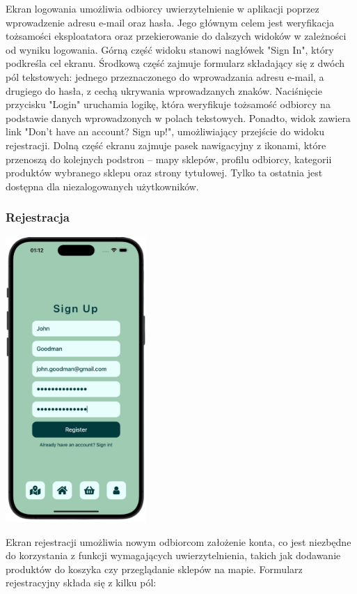 Ekran logowania umożliwia odbiorcy uwierzytelnienie w aplikacji poprzez wprowadzenie adresu e-mail oraz hasła. Jego głównym celem jest weryfikacja tożsamości eksploatatora oraz przekierowanie do dalszych widoków w zależności od wyniku logowania. Górną część widoku stanowi nagłówek "Sign In", który podkreśla cel ekranu. Środkową część zajmuje formularz składający się z dwóch pól tekstowych: jednego przeznaczonego do wprowadzania adresu e-mail, a drugiego do hasła, z cechą ukrywania wprowadzanych znaków. Naciśnięcie przycisku "Login" uruchamia logikę, która weryfikuje tożsamość odbiorcy na podstawie danych wprowadzonych w polach tekstowych. Ponadto, widok zawiera link "Don't have an account? Sign up!", umożliwiający przejście do widoku rejestracji. Dolną część ekranu zajmuje pasek nawigacyjny z ikonami, które przenoszą do kolejnych podstron – mapy sklepów, profilu odbiorcy, kategorii produktów wybranego sklepu oraz strony tytułowej. Tylko ta ostatnia jest dostępna dla niezalogowanych użytkowników.

\subsubsection{Rejestracja}

\begin{center} \includegraphics[width=0.4\textwidth]{images/front/register_page.png} \end{center}

Ekran rejestracji umożliwia nowym odbiorcom założenie konta, co jest niezbędne do korzystania z funkcji wymagających uwierzytelnienia, takich jak dodawanie produktów do koszyka czy przeglądanie sklepów na mapie. Formularz rejestracyjny składa się z kilku pól:


